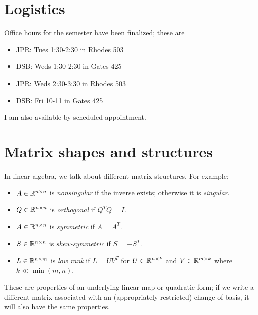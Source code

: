\documentclass[12pt, leqno]{article} %
\begin{document}


\section{Logistics}

Office hours for the semester have been finalized; these are
\begin{itemize}
\item JPR: Tues 1:30-2:30 in Rhodes 503
\item DSB: Weds 1:30-2:30 in Gates 425
\item JPR: Weds 2:30-3:30 in Rhodes 503
\item DSB: Fri 10-11 in Gates 425
\end{itemize}
I am also available by scheduled appointment.

\section{Matrix shapes and structures}

In linear algebra, we talk about different matrix structures.
For example:
\begin{itemize}
\item $A \in \mathbb{R}^{n \times n}$ is {\em nonsingular} if the inverse
  exists; otherwise it is {\em singular}.
\item $Q \in \mathbb{R}^{n \times n}$ is {\em orthogonal} if $Q^T Q = I$.
\item $A \in \mathbb{R}^{n \times n}$ is {\em symmetric} if $A = A^T$.
\item $S \in \mathbb{R}^{n \times n}$ is {\em skew-symmetric} if $S = -S^T$.
\item $L \in \mathbb{R}^{n \times m}$ is {\em low rank} if $L = UV^T$
  for $U \in \mathbb{R}^{n \times k}$ and $V \in \mathbb{R}^{m \times k}$ where
  $k \ll \min(m,n)$.
\end{itemize}
These are properties of an underlying linear map or quadratic form; if
we write a different matrix associated with an (appropriately
restricted) change of basis, it will also have the same properties.
\end{document}
